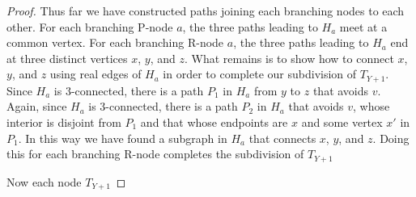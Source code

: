 \documentclass[a4paper,11pt]{article}
\theoremstyle{plain}
\theoremstyle{definition}
\begin{document}
\begin{proof}
  Thus far we have constructed paths joining each branching nodes to
  each other.  For each branching P-node $a$, the three paths leading to
  $H_a$ meet at a common vertex.  
  For each branching R-node $a$, the three
  paths leading to $H_a$ end at three distinct vertices $x$, $y$, and $z$.
  What remains is to show how to connect $x$, $y$, and $z$ using real edges of $H_a$ in order to complete our subdivision of $T_{Y+1}$.
  Since $H_a$ is 3-connected, there is a path $P_1$ in $H_a$ from $y$
  to $z$ that avoids $v$.  Again, since $H_a$ is 3-connected, there is
  a path $P_2$ in $H_a$ that avoids $v$, whose interior is disjoint from
  $P_1$ and that whose endpoints are $x$ and some vertex $x'$ in $P_1$.
  In this way we have found a subgraph in $H_a$ that connects $x$, $y$, and $z$.  Doing this for each branching R-node completes the subdivision of $T_{Y+1}$

  Now each node $T_{Y+1}$

\end{proof}
\end{document}

